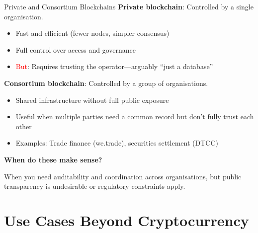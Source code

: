 \documentclass[10pt]{beamer}
\newcommand{\bad}[1]{\textcolor{red}{#1}}
\begin{document}
\begin{frame}{Private and Consortium Blockchains}
  \textbf{Private blockchain}: Controlled by a single organisation.
  
  \begin{itemize}
    \item Fast and efficient (fewer nodes, simpler consensus)
    \item Full control over access and governance
    \item \bad{But}: Requires trusting the operator---arguably ``just a database''
  \end{itemize}
  
  \vspace{1em}
  \textbf{Consortium blockchain}: Controlled by a group of organisations.
  
  \begin{itemize}
    \item Shared infrastructure without full public exposure
    \item Useful when multiple parties need a common record but don't fully trust each other
    \item Examples: Trade finance (we.trade), securities settlement (DTCC)
  \end{itemize}
  
  \vspace{1em}
  \textbf{When do these make sense?}
  
  When you need auditability and coordination across organisations, but public transparency is undesirable or regulatory constraints apply.
\end{frame}

\section{Use Cases Beyond Cryptocurrency}
\end{document}
